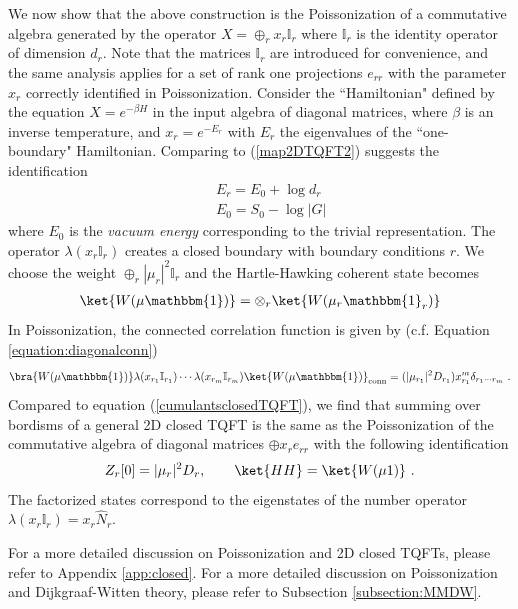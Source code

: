 \documentclass[a4paper,11pt]{article}
\theoremstyle{definition}
\numberwithin{equation}{section}
\begin{document}
We now show that the above construction is the Poissonization of a commutative algebra generated by the operator $X=\oplus_r x_r \mathbb{I}_r$ where $\mathbb{I}_r$ is the identity operator of dimension $d_r$. Note that the matrices $\mathbb{I}_{r}$ are introduced for convenience, and the same analysis applies for a set of rank one projections $e_{rr}$ with the parameter $x_r$ correctly identified in Poissonization. Consider the ``Hamiltonian" defined by the equation $X=e^{-\beta H}$ in the input algebra of diagonal matrices, where $\beta$ is an inverse temperature, and $x_r=e^{-E_r}$ with $E_r$ the eigenvalues of the ``one-boundary" Hamiltonian. Comparing to (\ref{map2DTQFT2}) suggests the identification 
\begin{eqnarray}
    &&E_r=E_0+\log d_r\\
    &&E_0=S_0-\log |G|
\end{eqnarray}
where $E_0$ is the {\it vacuum energy} corresponding to the trivial representation. The operator $\lambda(x_r\mathbb{I}_r)$ creates a closed boundary with boundary conditions $r$. We choose the weight $\oplus_r|\mu_r|^2\mathbb{I}_r$ and the Hartle-Hawking coherent state becomes
\begin{eqnarray}
    \ket{W(\mu \mathbbm{1})}=\otimes_r \ket{W(\mu_r \mathbbm{1}_r)}
\end{eqnarray}
In Poissonization, the connected correlation function is given by (c.f. Equation \ref{equation:diagonalconn})
\begin{eqnarray}
    \bra{W(\mu \mathbbm{1})}\lambda(x_{r_1}\mathbb{I}_{r_1})\cdots \lambda(x_{r_m}\mathbb{I}_{r_m})\ket{W(\mu \mathbbm{1})}_\text{conn}=(|\mu_{r_1} |^2D_{r_1})x_{r_1}^m\delta_{r_1\cdots r_m}\ .
\end{eqnarray}
Compared to equation (\ref{cumulantsclosedTQFT}), we find that summing over bordisms of a general 2D closed TQFT is the same as the Poissonization of the commutative algebra of diagonal matrices $\oplus x_r e_{rr}$ with the following identification
\begin{eqnarray}
    Z_r[0]=|\mu_r|^2D_r,\qquad \ket{HH}=\ket{W(\mu 1)}\ .
\end{eqnarray}
The factorized states correspond to the eigenstates of the number operator $\lambda(x_r\mathbb{I}_r)=x_r\hat{N}_r$.

For a more detailed discussion on Poissonization and 2D closed TQFTs, please refer to Appendix \ref{app:closed}. For a more detailed discussion on Poissonization and Dijkgraaf-Witten theory, please refer to Subsection \ref{subsection:MMDW}.
\end{document}
